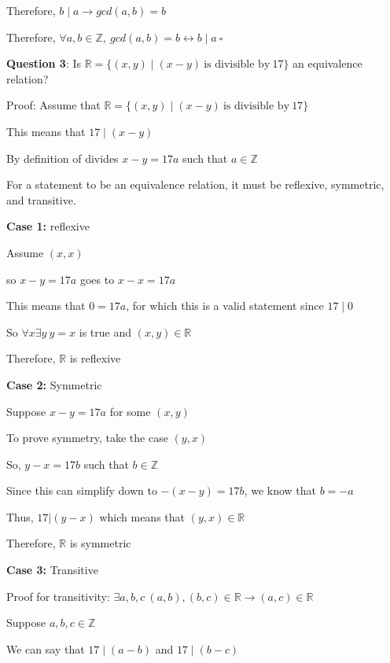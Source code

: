 \documentclass{article} %
\newcommand{\question}[2][]{\begin{flushleft}
        \textbf{Question #1}: #2
\end{flushleft}}
\begin{document}
    \tabto{1cm} Therefore, $b \mid a \rightarrow gcd(a, b) = b$

    Therefore, $\forall a, b \in \mathbb{Z}, \ gcd(a, b) = b \leftrightarrow b \mid a\ \square$

    \newpage

    \question[3]{Is $\mathbb{R} = \{(x, y) \mid (x - y)\ \text{is divisible by}\ 17\}$ an equivalence relation?}

    Proof: Assume that $\mathbb{R} = \{(x, y) \mid (x - y)\ \text{is divisible by}\ 17\}$

    This means that $17 \mid (x-y)$

    By definition of divides $x - y = 17a$ such that $a \in \mathbb{Z}$

    For a statement to be an equivalence relation, it must be reflexive, symmetric, and transitive.

    \textbf{Case 1:} reflexive

    \tabto{1cm} Assume $(x, x)$

    \tabto{1cm} so $x - y = 17a$ goes to $x - x = 17a$

    \tabto{1cm} This means that $0 = 17a$, for which this is a valid statement since $17 \mid 0$

    \tabto{1cm} So $\forall x \exists y\ y = x$ is true and $(x, y) \in \mathbb{R}$

    \tabto{1cm} Therefore, $\mathbb{R}$ is reflexive

    \textbf{Case 2:} Symmetric

    \tabto{1cm} Suppose $x - y = 17a$ for some $(x, y)$
    
    \tabto{1cm} To prove symmetry, take the case $(y, x)$

    \tabto{1cm} So, $y - x = 17b$ such that $b \in \mathbb{Z}$

    \tabto{1cm} Since this can simplify down to $-(x - y) = 17b$, we know that $b = -a$

    \tabto{1cm} Thus, $17 | (y - x)$ which means that $(y, x) \in \mathbb{R}$

    \tabto{1cm} Therefore, $\mathbb{R}$ is symmetric

    \textbf{Case 3:} Transitive

    \tabto{1cm} Proof for transitivity: $\exists a, b, c\ (a, b), (b, c) \in \mathbb{R} \rightarrow (a, c) \in \mathbb{R}$

    \tabto{1cm} Suppose $a, b, c \in \mathbb{Z}$

    \tabto{1cm} We can say that $17 \mid (a - b)$ and $17 \mid (b - c)$
\end{document}
